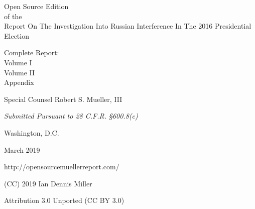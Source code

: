 \thispagestyle{empty}

\begin{center}
\Huge
Open Source Edition \\
of the \\
Report On The Investigation Into Russian Interference In The 2016 Presidential Election

\vspace{10 mm}

\large
Complete Report:\\
Volume I\\
Volume II\\
Appendix

\vspace{10 mm}

Special Counsel Robert S. Mueller, III

\vspace{10 mm}

\normalsize

\textit{Submitted Pursuant to 28 C.F.R. \S 600.8(c)}

\vspace{20 mm}

Washington, D.C.

\vspace{10 mm}

March 2019

\vspace{10 mm}

\large
http://opensourcemuellerreport.com/

\vspace{10 mm}

\normalsize
(CC) 2019 Ian Dennis Miller

Attribution 3.0 Unported (CC BY 3.0)

\end{center}

\newpage
